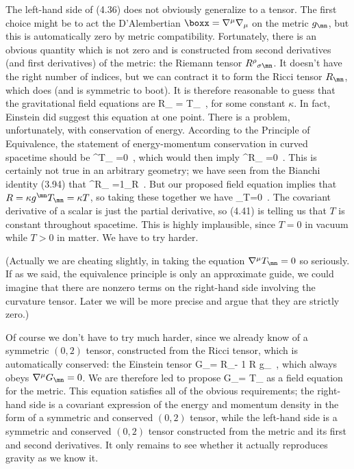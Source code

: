 The left-hand side of (4.36) does not obviously generalize to
a tensor.  The first choice might be to act the D'Alembertian
$\boxx = \nabla^\mu \nabla_\mu$ on the metric $g_\mn$, but this
is automatically zero by metric compatibility.  Fortunately, there
is an obvious quantity which is not zero and is constructed from
second derivatives (and first derivatives) of the metric: the
Riemann tensor $R^\rho{}_{\sigma\mn}$.  It doesn't have the right
number of indices, but we can contract it to form the Ricci tensor
$R_{\mn}$, which does (and is symmetric to boot).  It is therefore
reasonable to guess that the gravitational field equations are
\be
  R_{\mn} = \kappa T_{\mn}\ ,\label{4.37}
\ee
for some constant $\kappa$.  In fact, Einstein did suggest this
equation at one point.  There is a problem, unfortunately, with
conservation of energy.  According to the Principle of Equivalence,
the statement of energy-momentum conservation in curved spacetime
should be
\be
  \nabla^\mu T_{\mn} =0\ ,\label{4.38}
\ee
which would then imply
\be
  \nabla^\mu R_{\mn} =0\ .\label{4.39}
\ee
This is certainly not true in an arbitrary geometry; we have seen
from the Bianchi identity (3.94) that
\be
  \nabla^\mu R_{\mn} ={1}\nabla_\nu R\ .\label{4.40}
\ee
But our proposed field equation implies that $R=\kappa g^{\mn}
T_{\mn} = \kappa T$, so taking these together we have
\be
  \nabla_\mu T=0\ .\label{4.41}
\ee
The covariant derivative of a scalar is just the partial derivative,
so (4.41) is telling us that $T$ is constant throughout spacetime.
This is highly implausible, since $T=0$ in vacuum while $T>0$ in
matter.  We have to try harder.

(Actually we are cheating slightly, in taking the equation
$\nabla^\mu T_{\mn} =0$ so seriously.  If as we said, the equivalence
principle is only an approximate guide, we could imagine that there are
nonzero terms on the right-hand side involving the curvature tensor.  
Later we will be more precise and argue that they are strictly zero.)

Of course we don't have to try much harder, since we already know
of a symmetric $(0,2)$ tensor, constructed from the Ricci tensor,
which is automatically conserved: the Einstein tensor
\be
  G_\mn = R_\mn - {1} R g_\mn\ ,\label{4.42}
\ee
which always obeys $\nabla^\mu G_\mn =0$.  We are therefore led to
propose
\be
  G_\mn = \kappa T_\mn\label{4.43}
\ee
as a field equation for the metric.  This equation satisfies all
of the obvious requirements; the right-hand side is a covariant
expression of the energy and momentum density in the form of a
symmetric and conserved $(0,2)$ tensor, while the left-hand side
is a symmetric and conserved $(0,2)$ tensor constructed from the metric
and its first and second derivatives.  It only remains to see whether
it actually reproduces gravity as we know it.  

